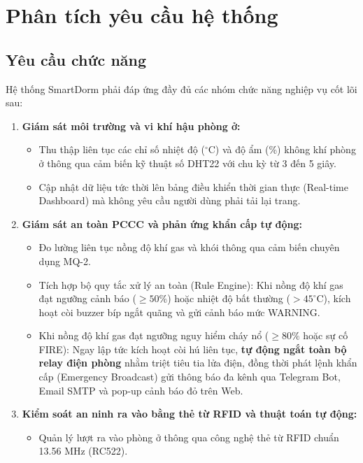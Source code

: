 \section{Phân tích yêu cầu hệ thống}
\label{sec:phan_tich_yeu_cau}

\subsection{Yêu cầu chức năng}
\label{subsec:yeu_cau_chuc_nang}

Hệ thống SmartDorm phải đáp ứng đầy đủ các nhóm chức năng nghiệp vụ cốt lõi sau:
\begin{enumerate}
    \item \textbf{Giám sát môi trường và vi khí hậu phòng ở:}
    \begin{itemize}
        \item Thu thập liên tục các chỉ số nhiệt độ ($^\circ\text{C}$) và độ ẩm (\%) không khí phòng ở thông qua cảm biến kỹ thuật số DHT22 với chu kỳ từ 3 đến 5 giây.
        \item Cập nhật dữ liệu tức thời lên bảng điều khiển thời gian thực (Real-time Dashboard) mà không yêu cầu người dùng phải tải lại trang.
    \end{itemize}
    \item \textbf{Giám sát an toàn PCCC và phản ứng khẩn cấp tự động:}
    \begin{itemize}
        \item Đo lường liên tục nồng độ khí gas và khói thông qua cảm biến chuyên dụng MQ-2.
        \item Tích hợp bộ quy tắc xử lý an toàn (Rule Engine): Khi nồng độ khí gas đạt ngưỡng cảnh báo ($\ge 50\%$) hoặc nhiệt độ bất thường ($> 45^\circ\text{C}$), kích hoạt còi buzzer bíp ngắt quãng và gửi cảnh báo mức WARNING.
        \item Khi nồng độ khí gas đạt ngưỡng nguy hiểm cháy nổ ($\ge 80\%$ hoặc sự cố FIRE): Ngay lập tức kích hoạt còi hú liên tục, \textbf{tự động ngắt toàn bộ relay điện phòng} nhằm triệt tiêu tia lửa điện, đồng thời phát lệnh khẩn cấp (Emergency Broadcast) gửi thông báo đa kênh qua Telegram Bot, Email SMTP và pop-up cảnh báo đỏ trên Web.
    \end{itemize}
    \item \textbf{Kiểm soát an ninh ra vào bằng thẻ từ RFID và thuật toán tự động:}
    \begin{itemize}
        \item Quản lý lượt ra vào phòng ở thông qua công nghệ thẻ từ RFID chuẩn 13.56 MHz (RC522).

\end{itemize}
\end{enumerate}
